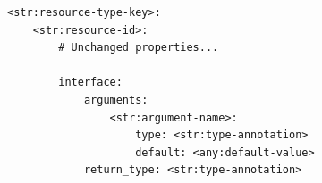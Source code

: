 \begin{listing}[H]
    \begin{verbatim}
<str:resource-type-key>:
    <str:resource-id>:
        # Unchanged properties...

        interface:
            arguments:
                <str:argument-name>:
                    type: <str:type-annotation>
                    default: <any:default-value>
            return_type: <str:type-annotation>
    \end{verbatim}
    \caption{Updated Interface Specification}
    \label{lst:updated-interface-specification}
\end{listing}

\begin{listing}[H]
    \inputminted{yaml}{../../../lib/scenarios/mitm/scenario.yaml}
    \caption{mitm Scenario YAML}
    \label{lst:mitm-scenario-yaml}
\end{listing}
